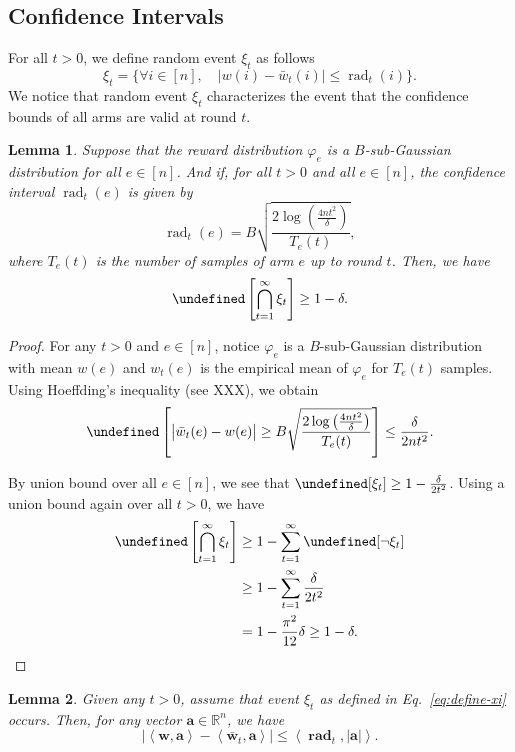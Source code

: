 \documentclass{article}
\newtheorem{lemma}{Lemma}
\newcommand{\Rew}{\varphi}
\newcommand{\RR}{\mathbb R}
\DeclareMathOperator{\rad}{rad}
\let\Pr\undefined
\DeclareMathOperator{\Pr}{Pr}
\newcommand{\inn}[1]{\left\langle #1 \right\rangle}
\renewcommand{\vec}[1]{\boldsymbol{#1}}
\begin{document}
\begin{spacing}{1.1}
\subsection{Confidence Intervals}

For all $t>0$, we define random event $\xi_t$ as follows
\begin{equation}
\xi_t = \Big\{
\forall i\in[n],\quad 
|w(i)-\bar w_t(i)| \le \rad_t(i) 
\Big\}.
\label{eq:define-xi}
\end{equation}
We notice that random event $\xi_t$ characterizes the event that the confidence bounds of all arms are valid at round $t$.

\begin{lemma}
\label{lemma:ci}
Suppose that the reward distribution $\Rew_e$ is a $B$-sub-Gaussian distribution for all $e\in [n]$.
And if, for all $t>0$ and all $e\in [n]$, 
the confidence interval $\rad_t(e)$ is given by
$$
\rad_t(e) = B\sqrt{\frac{2\log\left(\frac{4n t^2}\delta\right)}{T_e(t)}},
$$
where $T_e(t)$ is the number of samples of arm $e$ up to round $t$.
Then, we have
$$
\Pr\left[\bigcap_{t=1}^\infty \xi_t \right] \ge 1-\delta.
$$
\end{lemma}

\begin{proof}
For any $t>0$ and $e\in [n]$, notice $\Rew_e$ is a $B$-sub-Gaussian distribution with mean $w(e)$ and $w_t(e)$ is the empirical mean of $\Rew_e$ for $T_e(t)$ samples. 
Using Hoeffding's inequality (see XXX), we obtain
$$
\Pr\left[ \big|\bar w_t(e)-w(e) \big| \ge B\sqrt{\frac{2\log\left(\frac{4n t^2}\delta\right)}{T_e(t)}} \right] \le \frac{\delta}{2nt^2}.
$$

By union bound over all $e\in [n]$, we see that $\Pr[\xi_t] \ge 1-\frac{\delta}{2t^2}$. 
Using a union bound again over all $t>0$, we have
\begin{align*}
\Pr\left[\bigcap_{t=1}^\infty \xi_t \right] &\ge 1-\sum_{t=1}^\infty \Pr[\neg \xi_t]\\
&\ge 1-\sum_{t=1}^\infty \frac{\delta}{2t^2}\\
&= 1-\frac{\pi^2}{12}\delta \ge 1-\delta.
\end{align*}
\end{proof}


\begin{lemma}
\label{lemma:ci-property}
Given any $t>0$, assume that event $\xi_t$ as defined in Eq.~\eqref{eq:define-xi} occurs. 
Then, for any vector $\vec a \in \RR^n$, we have
$$
\big|\inn{\vec w,\vec a} - \inn{\vec {\bar w}_t, \vec a}\big| \le \inn{\vec \rad_t, |\vec a|}.
$$
\end{lemma}


\end{spacing}
\end{document}

